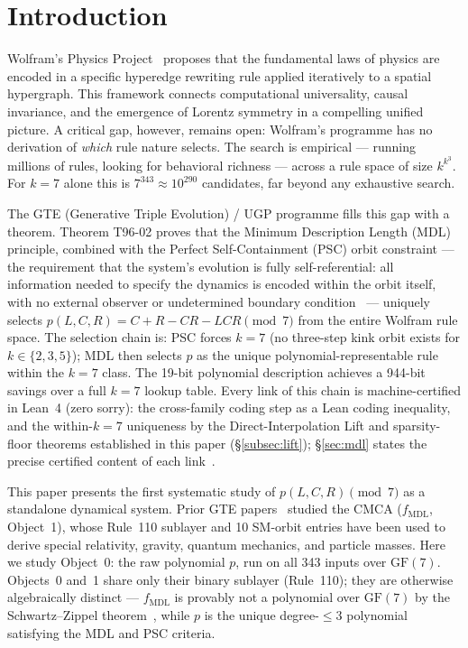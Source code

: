 \documentclass[11pt]{article}
\theoremstyle{remark}
\newcommand{\GF}[1]{\ensuremath{\mathrm{GF}(#1)}}
\newcommand{\fmdl}{\ensuremath{f_{\mathrm{MDL}}}}
\begin{document}
\section{Introduction}
\label{sec:intro}

Wolfram's Physics Project~\cite{Wolfram2020Tech,Wolfram2002} proposes that
the fundamental laws of physics are encoded in a specific hyperedge rewriting
rule applied iteratively to a spatial hypergraph. This framework connects
computational universality, causal invariance, and the emergence of Lorentz
symmetry in a compelling unified picture. A critical gap, however, remains
open: Wolfram's programme has no derivation of \emph{which} rule nature
selects. The search is empirical --- running millions of rules, looking for
behavioral richness --- across a rule space of size $k^{k^3}$. For $k = 7$
alone this is $7^{343} \approx 10^{290}$ candidates, far beyond any exhaustive
search.

The GTE (Generative Triple Evolution) / UGP programme fills this gap with a
theorem. Theorem T96-02
proves that the Minimum Description Length (MDL) principle, combined with the
Perfect Self-Containment (PSC) orbit constraint --- the requirement that the
system's evolution is fully self-referential: all information needed to specify
the dynamics is encoded within the orbit itself, with no external observer or
undetermined boundary condition~\cite{SpivackGTEMobius,
SpivackCompUniversality} --- uniquely selects
$p(L,C,R) = C+R-CR-LCR \pmod{7}$ from the entire Wolfram rule space. The
selection chain is: PSC forces $k = 7$ (no three-step kink orbit exists for
$k \in \{2,3,5\}$); MDL then selects $p$ as the unique polynomial-representable
rule within the $k = 7$ class. The 19-bit polynomial description achieves a
944-bit savings over a full $k = 7$ lookup table. Every link of this chain
is machine-certified in Lean~4 (zero sorry): the cross-family coding step as
a Lean coding inequality, and the within-$k{=}7$ uniqueness by the
Direct-Interpolation Lift and sparsity-floor theorems established in this
paper (§\ref{subsec:lift}); §\ref{sec:mdl} states the precise certified
content of each link~\cite{SpivackGTEPolynomialUFT}.

This paper presents the first systematic study of $p(L,C,R) \pmod{7}$ as a
standalone dynamical system. Prior GTE papers~\cite{SpivackCMCA,
SpivackThreeTapeCMCA} studied the CMCA ($\fmdl{}$, Object~1), whose
Rule~110 sublayer and 10 SM-orbit entries have been used to derive special
relativity, gravity, quantum mechanics, and particle masses. Here we study
Object~0: the raw polynomial $p$, run on all 343 inputs over $\GF{7}$.
Objects~0 and~1 share only their binary sublayer (Rule~110); they are
otherwise algebraically distinct --- $\fmdl{}$ is provably not a polynomial
over $\GF{7}$ by the Schwartz--Zippel theorem~\cite{Schwartz1980,Zippel1979},
while $p$ is the unique degree-${\leq}3$ polynomial satisfying the MDL and PSC
criteria.
\end{document}

